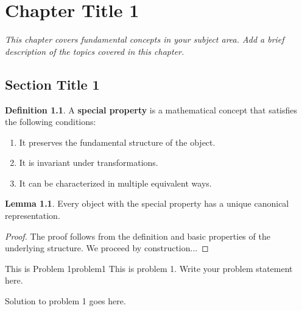 \documentclass[11pt, oneside, openany]{book}
\theoremstyle{definition}
\newtheorem{lemma}{Lemma}[section]
\newtheorem{definition}{Definition}[section]
\begin{document}

\chapter{Chapter Title 1}
\thispagestyle{fancy}

\begin{tcolorbox}[
    enhanced,
    colback=lightgray,
    colframe=darkgray,
    boxrule=0.5pt,
    arc=2pt,
    left=4mm,
    right=4mm,
    top=3mm,
    bottom=3mm
]
\textit{This chapter covers fundamental concepts in your subject area. 
Add a brief description of the topics covered in this chapter.}
\end{tcolorbox}

\section{Section Title 1}

\begin{definition}
A \textbf{special property} is a mathematical concept that satisfies the following conditions:
\begin{enumerate}
    \item It preserves the fundamental structure of the object.
    \item It is invariant under transformations.
    \item It can be characterized in multiple equivalent ways.
\end{enumerate}
\end{definition}

\begin{lemma}
Every object with the special property has a unique canonical representation.
\end{lemma}
\begin{proof}
The proof follows from the definition and basic properties of the underlying structure. We proceed by construction...
\end{proof}

\begin{problem}{This is Problem 1}{problem1}
    This is problem 1. Write your problem statement here.
\end{problem}
\begin{solution}
    Solution to problem 1 goes here.
\end{solution}
\end{document}
